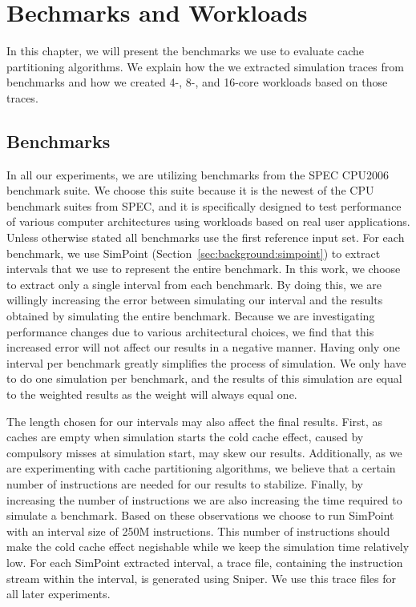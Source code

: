 
\chapter{Bechmarks and Workloads}
\label{cpt:benchmarks_workloads}

In this chapter, we will present the benchmarks we use to evaluate cache partitioning algorithms.
We explain how the we extracted simulation traces from benchmarks and how we created 4-, 8-, and 16-core workloads based on those traces.

\section{Benchmarks}

In all our experiments, we are utilizing benchmarks from the SPEC CPU2006 benchmark suite. 
We choose this suite because it is the newest of the CPU benchmark suites from SPEC, and it is specifically designed to test performance of various computer architectures using workloads based on real user applications.
Unless otherwise stated all benchmarks use the first reference input set.
For each benchmark, we use SimPoint (Section~\ref{sec:background:simpoint}) to extract intervals that we use to represent the entire benchmark.
In this work, we choose to extract only a single interval from each benchmark.
By doing this, we are willingly increasing the error between simulating our interval and the results obtained by simulating the entire benchmark.
Because we are investigating performance changes due to various architectural choices, we find that this increased error will not affect our results in a negative manner.
Having only one interval per benchmark greatly simplifies the process of simulation.
We only have to do one simulation per benchmark, and the results of this simulation are equal to the weighted results as the weight will always equal one.

The length chosen for our intervals may also affect the final results.
First, as caches are empty when simulation starts the cold cache effect, caused by compulsory misses at simulation start, may skew our results.
Additionally, as we are experimenting with cache partitioning algorithms, we believe that a certain number of instructions are needed for our results to stabilize.
Finally, by increasing the number of instructions we are also increasing the time required to simulate a benchmark.
Based on these observations we choose to run SimPoint with an interval size of 250M instructions.
This number of instructions should make the cold cache effect negishable while we keep the simulation time relatively low.
For each SimPoint extracted interval, a trace file, containing the instruction stream within the interval, is generated using Sniper.
We use this trace files for all later experiments.

